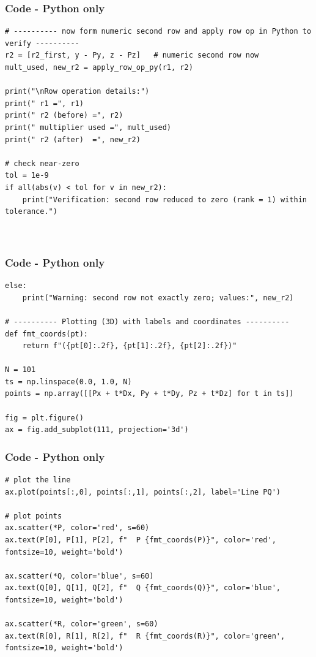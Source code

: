 \documentclass{beamer}
\theoremstyle{remark}
\numberwithin{equation}{section}
\begin{document}
\begin{frame}[fragile]
\frametitle{Code - Python only}
\begin{lstlisting}
# ---------- now form numeric second row and apply row op in Python to verify ----------
r2 = [r2_first, y - Py, z - Pz]   # numeric second row now
mult_used, new_r2 = apply_row_op_py(r1, r2)

print("\nRow operation details:")
print(" r1 =", r1)
print(" r2 (before) =", r2)
print(" multiplier used =", mult_used)
print(" r2 (after)  =", new_r2)

# check near-zero
tol = 1e-9
if all(abs(v) < tol for v in new_r2):
    print("Verification: second row reduced to zero (rank = 1) within tolerance.")



\end{lstlisting}
\end{frame}

\begin{frame}[fragile]
\frametitle{Code - Python only}
\begin{lstlisting}
else:
    print("Warning: second row not exactly zero; values:", new_r2)

# ---------- Plotting (3D) with labels and coordinates ----------
def fmt_coords(pt):
    return f"({pt[0]:.2f}, {pt[1]:.2f}, {pt[2]:.2f})"

N = 101
ts = np.linspace(0.0, 1.0, N)
points = np.array([[Px + t*Dx, Py + t*Dy, Pz + t*Dz] for t in ts])

fig = plt.figure()
ax = fig.add_subplot(111, projection='3d')

\end{lstlisting}
\end{frame}

\begin{frame}[fragile]
\frametitle{Code - Python only}
\begin{lstlisting}
# plot the line
ax.plot(points[:,0], points[:,1], points[:,2], label='Line PQ')

# plot points
ax.scatter(*P, color='red', s=60)
ax.text(P[0], P[1], P[2], f"  P {fmt_coords(P)}", color='red', fontsize=10, weight='bold')

ax.scatter(*Q, color='blue', s=60)
ax.text(Q[0], Q[1], Q[2], f"  Q {fmt_coords(Q)}", color='blue', fontsize=10, weight='bold')

ax.scatter(*R, color='green', s=60)
ax.text(R[0], R[1], R[2], f"  R {fmt_coords(R)}", color='green', fontsize=10, weight='bold')

\end{lstlisting}
\end{frame}
\end{document}
